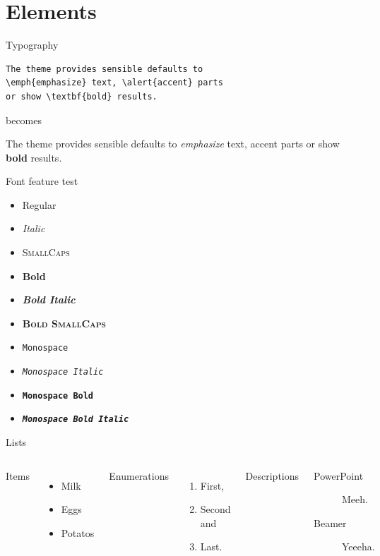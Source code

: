 \documentclass[10pt]{beamer} %
\begin{document}
\section{Elements}
\begin{frame}[fragile]{Typography}
      \begin{verbatim}The theme provides sensible defaults to
\emph{emphasize} text, \alert{accent} parts
or show \textbf{bold} results.\end{verbatim}

  \begin{center}becomes\end{center}

  The theme provides sensible defaults to \emph{emphasize} text,
  \alert{accent} parts or show \textbf{bold} results.
\end{frame}
\begin{frame}{Font feature test}
  \begin{itemize}
    \item Regular
    \item \textit{Italic}
    \item \textsc{SmallCaps}
    \item \textbf{Bold}
    \item \textbf{\textit{Bold Italic}}
    \item \textbf{\textsc{Bold SmallCaps}}
    \item \texttt{Monospace}
    \item \texttt{\textit{Monospace Italic}}
    \item \texttt{\textbf{Monospace Bold}}
    \item \texttt{\textbf{\textit{Monospace Bold Italic}}}
  \end{itemize}
\end{frame}
\begin{frame}{Lists}
  \begin{columns}[T,onlytextwidth]
      Items
      \begin{itemize}
        \item Milk \item Eggs \item Potatos
      \end{itemize}

      Enumerations
      \begin{enumerate}
        \item First, \item Second and \item Last.
      \end{enumerate}

      Descriptions
      \begin{description}
        \item[PowerPoint] Meeh. \item[Beamer] Yeeeha.
      \end{description}
  \end{columns}
\end{frame}
\end{document}
